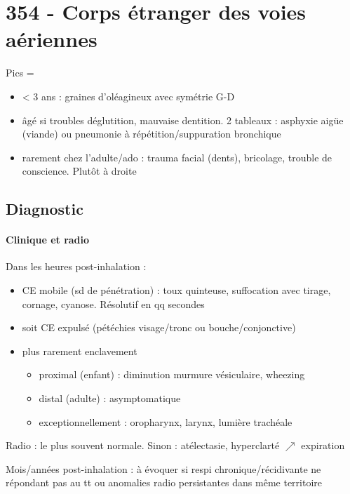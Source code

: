 \section{354 - Corps étranger des voies aériennes}%
\label{sec:354_corps_etranger_des_voies_aeriennes}

Pics = 
\begin{itemize}
\item < 3 ans : graines d'oléagineux avec symétrie G-D
\item âgé si troubles déglutition, mauvaise dentition. 2 tableaux : asphyxie
  aigüe (viande) ou pneumonie à répétition/suppuration bronchique
\item rarement chez l'adulte/ado : trauma facial (dents), bricolage, trouble
  de conscience. Plutôt à droite
\end{itemize}

\subsection{Diagnostic}
\paragraph{Clinique et radio}
Dans les heures post-inhalation :
\begin{itemize}
\item CE mobile (sd de pénétration) : toux quinteuse, suffocation avec tirage,
  cornage, cyanose. Résolutif en qq secondes
\item soit CE expulsé (pétéchies visage/tronc ou bouche/conjonctive)
\item plus rarement enclavement 
  \begin{itemize}
  \item proximal (enfant) : diminution murmure vésiculaire, wheezing
  \item distal (adulte) : asymptomatique
  \item exceptionnellement : oropharynx, larynx, lumière trachéale
  \end{itemize}
\end{itemize}
Radio : le plus souvent normale. Sinon : atélectasie, hyperclarté $\nearrow$
expiration

Mois/années post-inhalation : à évoquer si respi chronique/récidivante ne
répondant pas au tt ou anomalies radio persistantes dans même territoire

